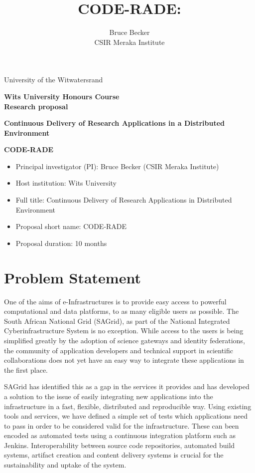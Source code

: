 \documentclass[oneside, a4paper, onecolumn, 11pt]{article}
\title{CODE-RADE:\\ }
\author{Bruce Becker\\ CSIR Meraka Institute}
\begin{document}
\noindent
University of the Witwatersrand

\vfill

\begin{center}
\large{\textbf{Wits University Honours Course\\
Research proposal }
}
\vfill

\LARGE{\textbf{Continuous Delivery of Research Applications in a Distributed Environment }}

\vfill

\LARGE{\textbf{CODE-RADE}}

\vfill

\end{center}

\vfill

\begin{itemize}
\item Principal investigator (PI): Bruce Becker (CSIR Meraka Institute)
\item Host institution: Wits University
\item Full title: Continuous Delivery of Research Applications in Distributed Environment
\item Proposal short name: CODE-RADE
\item Proposal duration: 10 months
\end{itemize}


\vfill

\noindent
\section{Problem Statement}
One of the aims of e-Infrastructures is to provide easy access to powerful computational and data platforms, to as many eligible users as possible. The South African National Grid (SAGrid), as part of the National Integrated Cyberinfrastructure System is no exception. While access to the users is being simplified greatly by the adoption of science gateways and identity federations, the community of application developers and technical support in scientific collaborations does not yet have an easy way to integrate these applications in the first place.

SAGrid has identified this as a gap in the services it provides and has developed a solution to the issue of easily integrating new applications into the infrastructure in a fast, flexible, distributed and reproducible way. Using existing tools and services, we have defined a simple set of tests which applications need to pass in order to be considered valid for the infrastructure. These can been encoded as automated tests using a continuous integration platform such as Jenkins. Interoperability between source code repositories, automated build systems, artifact creation and content delivery systems is crucial for the sustainability and uptake of the system.
\end{document}
